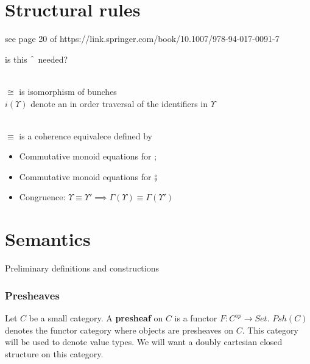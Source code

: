 \documentclass{article}
\begin{document}
\section{Structural rules}
see page 20 of  https://link.springer.com/book/10.1007/978-94-017-0091-7

\begin{prooftree}
\end{prooftree}
is this $\string^$ needed?

\begin{prooftree}
\end{prooftree}



\begin{prooftree}
\end{prooftree}
\\
$\cong$ is isomorphism of bunches
\\
$i(\Upsilon)$ denote an in order traversal of the identifiers in $\Upsilon$
    
\begin{prooftree}
\end{prooftree}
\\
$\equiv$ is a coherence equivalece defined by 
\begin{itemize}
    \item Commutative monoid equations for $;$
    \item Commutative monoid equations for $\fatsemi$
    \item Congruence: $\Upsilon \equiv \Upsilon' \implies \Gamma(\Upsilon) \equiv \Gamma(\Upsilon')$
\end{itemize}

\section{Semantics}
Preliminary definitions and constructions
\subsubsection{Presheaves}
Let $C$ be a small category. A \textbf{presheaf} on $C$ is a functor $F : C^{op} \rightarrow Set$. $Psh(C)$ denotes the functor category where objects are presheaves on $C$. This category will be used to denote value types. We will want a doubly cartesian closed structure on this category.\\
\end{document}
